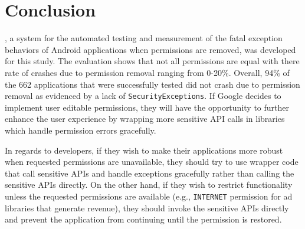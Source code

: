 \chapter{Conclusion}
\label{sec:conclusion}

\toolname, a system for the automated testing and measurement of the fatal exception behaviors of Android applications when permissions are removed, was developed for this study.  The evaluation shows that not all permissions are equal with there rate of crashes due to permission removal ranging from 0-20\%. Overall, 94\% of the 662 applications that were successfully tested did not crash due to permission removal as evidenced by a lack of \texttt{SecurityExceptions}.  If Google decides to implement user editable permissions, they will have the opportunity to further enhance the user experience by wrapping more sensitive API calls in libraries which handle permission errors gracefully. 

In regards to developers, if they wish to make their applications more robust when requested permissions are unavailable, they should try to use wrapper code that call sensitive APIs and handle exceptions gracefully rather than calling the sensitive APIs directly.  On the other hand, if they wish to restrict functionality unless the requested permissions are available (e.g., \texttt{INTERNET} permission for ad libraries that generate revenue), they should invoke the sensitive APIs directly and prevent the application from continuing until the permission is restored.
